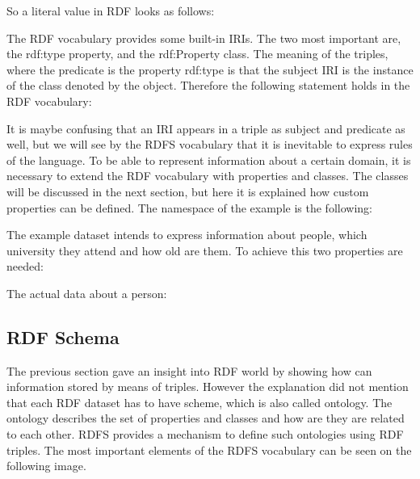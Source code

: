 
So a literal value in RDF looks as follows:


The RDF vocabulary provides some built-in IRIs. The two most important are, the rdf:type property, and the rdf:Property class. The meaning of the triples, where the predicate is the property rdf:type  is that the subject IRI is the instance of the class denoted by the object. Therefore the following statement holds in the RDF vocabulary:


It is maybe confusing that an IRI appears in a triple as subject and predicate as well, but we will see by the RDFS vocabulary that it is inevitable to express rules of the language.  
To be able to represent information about a certain domain, it is necessary to extend the RDF vocabulary with properties and classes. The classes will be discussed in the next section, but here it is explained how custom properties can be defined. The namespace of the example is the following: 



The example dataset intends to express information about people, which university they attend and how old are them. To achieve this two properties are needed:



The actual data about a person:



\subsection{RDF Schema}


The previous section gave an insight into RDF world by showing how can information stored by means of triples. However the explanation did not mention that each RDF dataset has to have scheme, which is also called ontology. The ontology describes the set of properties and classes and how are they are related to each other. RDFS provides a mechanism to define such ontologies using RDF triples. The most important elements of the RDFS vocabulary can be seen on the following image. 

